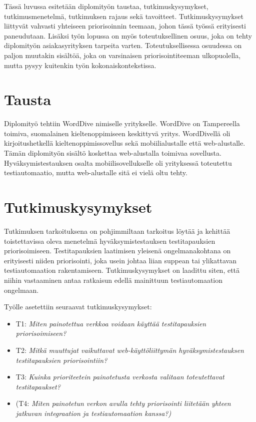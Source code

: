 Tässä luvussa esitetään diplomityön taustaa, tutkimuskysymykset, tutkimusmenetelmä, tutkimuksen rajaus sekä tavoitteet.
Tutkimuskysymykset liittyvät vahvasti yhteiseen priorisoinnin teemaan, johon tässä työssä erityisesti paneudutaan.
Lisäksi työn lopussa on myös toteutuksellinen osuus, joka on tehty diplomityön asiakasyrityksen tarpeita varten.
Toteutuksellisessa osuudessa on paljon muutakin sisältöä, joka on varsinaisen priorisointiteeman ulkopuolella, mutta pysyy kuitenkin työn kokonaiskontekstissa.

\section{Tausta}

Diplomityö tehtiin WordDive nimiselle yritykselle. WordDive on Tampereella toimiva, suomalainen kieltenoppimiseen keskittyvä yritys. WordDivellä oli kirjoitushetkellä kieltenoppimissovellus sekä mobiilialustalle että web-alustalle. Tämän diplomityön sisältö koskettaa web-alustalla toimivaa sovellusta. Hyväksymistestauksen osalta mobiilisovellukselle oli yrityksessä toteutettu testiautomaatio, mutta web-alustalle sitä ei vielä oltu tehty.


\section{Tutkimuskysymykset} \label{tutkimuskysymykset}

Tutkimuksen tarkoituksena on pohjimmiltaan tarkoitus löytää ja kehittää toistettavissa oleva menetelmä hyväksymistestauksen testitapauksien priorisoimiseen.
Testitapauksien laatimisen yleisenä ongelmanakohtana on erityisesti niiden priorisointi, joka usein johtaa liian suppean tai ylikattavan testiautomaation rakentamiseen.
Tutkimuskysymykset on laadittu siten, että niihin vastaaminen antaa ratkaisun edellä mainittuun testiautomaation ongelmaan.

Työlle asetettiin seuraavat tutkimuskysymykset:
\begin{itemize}
  \item T1: \emph{Miten painotettua verkkoa voidaan käyttää testitapauksien priorisoimiseen?}
  \item T2: \emph{Mitkä muuttujat vaikuttavat web-käyttöliittymän hyväksymistestauksen testitapauksien priorisointiin?}
  \item T3: \emph{Kuinka prioriteetein painotetusta verkosta valitaan toteutettavat testitapaukset?}
  \item (T4: \emph{Miten painotetun verkon avulla tehty priorisointi liitetään yhteen jatkuvan integraation ja testiautomaation kanssa?)}
\end{itemize}

